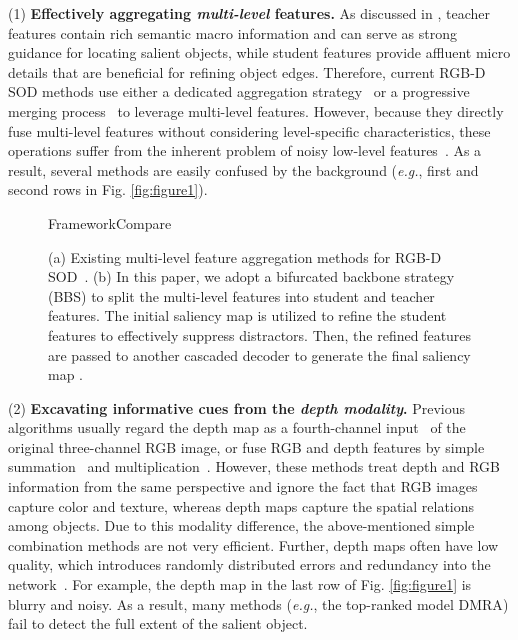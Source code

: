 \documentclass[journal]{IEEEtran}
\newcommand{\figref}[1]{Fig. \ref{#1}}
\def\eg{\emph{e.g.}}
\begin{document}
(1) \textbf{Effectively aggregating \emph{multi-level} features.}
As discussed in \cite{Liu2019SPBD}, teacher features contain rich semantic macro information and can serve as strong guidance for locating salient objects,
while student features provide affluent micro details that are beneficial for refining object edges.
Therefore, current RGB-D SOD methods use either a dedicated aggregation strategy~\cite{piao2019DMRA,zhao2019CPFP} or a progressive merging process~\cite{LIU2019SSRC,zhu2019PDNet} to leverage multi-level features.
However, because they directly fuse multi-level features without considering level-specific characteristics, these operations suffer from the inherent problem of noisy low-level features~\cite{chen2019TANet,Wu2019CPD}.
As a result, several methods are easily confused by the background (\eg, first and second rows in \figref{fig:figure1}).\par


\begin{figure*}[t!]
	\centering
	\begin{overpic}[width=.88\linewidth]{FrameworkCompare}
	\end{overpic}
	\vspace{-10pt}
	\caption{
		(a) Existing multi-level feature aggregation methods for RGB-D
		SOD~\cite{chen2018PCF,zhao2019CPFP,piao2019DMRA,chen2019TANet,zhu2019PDNet,wang2019AFNet,LIU2019SSRC}.
		(b) In this paper, we adopt a bifurcated backbone strategy (BBS)
		to split the multi-level features into student and teacher features.
		The initial saliency map  is utilized to refine the student features to effectively suppress distractors. Then, the refined features are 
		passed to another cascaded decoder to generate the final saliency map .
	}
	\label{fig:FrameworkCompare}
\end{figure*}

(2) \textbf{Excavating informative cues from the \emph{depth modality}.}
Previous algorithms usually regard the depth map as a fourth-channel input~\cite{cong2019HSCS,peng2014LHM} of the original three-channel RGB image, or fuse RGB and depth features by simple summation~\cite{fan2014DSP,fang2014TIP} and multiplication~\cite{cheng2014DESM,zhu2017CDCP}.
However, these methods treat depth and RGB information from the same perspective and ignore the fact that RGB images capture color and texture, whereas depth maps capture the spatial relations among objects.
Due to this modality difference, the above-mentioned simple combination methods are not very efficient.
Further, depth maps often have low quality, which introduces randomly distributed errors and redundancy into the network~\cite{fan2019D3Net}.
For example, the depth map in the last row of \figref{fig:figure1} is blurry and noisy. As a result, many methods (\eg, the top-ranked model DMRA\cite{piao2019DMRA}) fail to detect the full extent of the salient object.
\par
\end{document}
